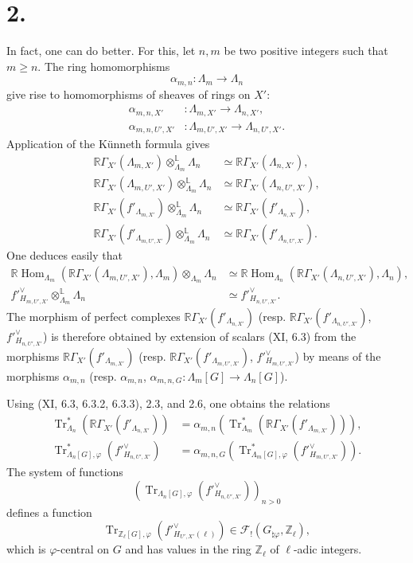\documentclass[11pt]{article}
\DeclareMathOperator{\Hom}{Hom}
\providecommand{\Tr}{\operatorname{Tr}}
\providecommand{\Tr}{\operatorname{Tr}}
\providecommand{\Tr}{\operatorname{Tr}}
\providecommand{\Hom}{\operatorname{Hom}}
\providecommand{\Tr}{\operatorname{Tr}}
\providecommand{\La}{\Lambda}
\providecommand{\bZ}{\mathbb Z}
\providecommand{\Hom}{\operatorname{Hom}}
\providecommand{\Tr}{\operatorname{Tr}}
\begin{document}
\section*{2.}
In fact, one can do better. For this, let $n,m$ be two positive integers such that $m\ge n$. The ring homomorphisms
\[
\alpha_{m,n}:\La_m\longrightarrow \La_n
\]
give rise to homomorphisms of sheaves of rings on $X'$:
\begin{align*}
\alpha_{m,n,X'}&:\La_{m,X'}\longrightarrow \La_{n,X'},\\
\alpha_{m,n,U',X'}&:\La_{m,U',X'}\longrightarrow \La_{n,U',X'} .
\end{align*}
Application of the Künneth formula gives
\begin{align}
\tag{2.1}\mathbb{R}\Gamma_{X'}(\La_{m,X'})\otimes_{\La_m}^{\mathbb L}\La_n&\simeq \mathbb{R}\Gamma_{X'}(\La_{n,X'}),\\
\tag{2.2}\mathbb{R}\Gamma_{X'}(\La_{m,U',X'})\otimes_{\La_m}^{\mathbb L}\La_n&\simeq \mathbb{R}\Gamma_{X'}(\La_{n,U',X'}),\\
\tag{2.3}\mathbb{R}\Gamma_{X'}(f'_{\La_{m,X'}})\otimes_{\La_m}^{\mathbb L}\La_n&\simeq \mathbb{R}\Gamma_{X'}(f'_{\La_{n,X'}}),\\
\tag{2.4}\mathbb{R}\Gamma_{X'}(f'_{\La_{m,U',X'}})\otimes_{\La_m}^{\mathbb L}\La_n&\simeq \mathbb{R}\Gamma_{X'}(f'_{\La_{n,U',X'}}).
\end{align}
One deduces easily that
\begin{align}
\tag{2.5}\mathbb{R}\Hom_{\La_m}(\mathbb{R}\Gamma_{X'}(\La_{m,U',X'}),\La_m)\otimes_{\La_m}\La_n&\simeq \mathbb{R}\Hom_{\La_n}(\mathbb{R}\Gamma_{X'}(\La_{n,U',X'}),\La_n),\\
\tag{2.6}f'^\vee_{H_{m,U',X'}}\otimes_{\La_m}^{\mathbb L}\La_n&\simeq f'^\vee_{H_{n,U',X'}}.
\end{align}
The morphism of perfect complexes $\mathbb{R}\Gamma_{X'}(f'_{\La_{n,X'}})$ (resp. $\mathbb{R}\Gamma_{X'}(f'_{\La_{n,U',X'}})$, $f'^\vee_{H_{n,U',X'}}$) is therefore obtained by extension of scalars (XI, 6.3) from the morphisms $\mathbb{R}\Gamma_{X'}(f'_{\La_{m,X'}})$ (resp. $\mathbb{R}\Gamma_{X'}(f'_{\La_{m,U',X'}})$, $f'^\vee_{H_{m,U',X'}}$) by means of the morphisms $\alpha_{m,n}$ (resp. $\alpha_{m,n}$, $\alpha_{m,n,G}:\La_m[G]\to\La_n[G]$).

Using (XI, 6.3, 6.3.2, 6.3.3), 2.3, and 2.6, one obtains the relations
\begin{align}
\tag{2.7}\Tr^*_{\La_n}(\mathbb{R}\Gamma_{X'}(f'_{\La_{n,X'}}))&=\alpha_{m,n}(\Tr^*_{\La_m}(\mathbb{R}\Gamma_{X'}(f'_{\La_{m,X'}}))),\\
\tag{2.8}\Tr^*_{\La_n[G],\varphi}(f'^\vee_{H_{n,U',X'}})&=\alpha_{m,n,G}(\Tr^*_{\La_m[G],\varphi}(f'^\vee_{H_{m,U',X'}})).
\end{align}
The system of functions
\[
(\Tr_{\La_n[G],\varphi}(f'^\vee_{H_{n,U',X'}}))_{n>0}
\]
defines a function
\[
\Tr_{\bZ_\ell[G],\varphi}(f'^\vee_{H_{U',X'}(\ell)})
\in \mathcal F_!(G_{\natural\varphi},\bZ_\ell),
\]
which is $\varphi$-central on $G$ and has values in the ring $\bZ_\ell$ of $\ell$-adic integers.
\end{document}
